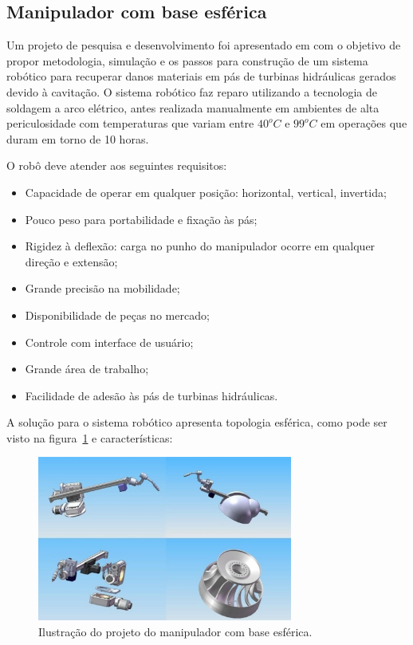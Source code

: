 \subsection{Manipulador com base esférica}
Um projeto de pesquisa e desenvolvimento foi apresentado em
\cite{motta2010prototype} com o objetivo de propor metodologia, simulação e
os passos para construção de um sistema robótico para recuperar danos materiais
em pás de turbinas hidráulicas gerados devido à cavitação. O sistema robótico faz
reparo utilizando a tecnologia de soldagem a arco elétrico, antes realizada
manualmente em ambientes de alta periculosidade com temperaturas que variam
entre $40^o C$ e $99^o C$ em operações que duram em torno de 10 horas.

O robô deve atender aos seguintes requisitos:
\begin{itemize}
  \item Capacidade de operar em qualquer posição: horizontal, vertical,
  invertida;
  \item Pouco peso para portabilidade e fixação às pás;
  \item Rigidez à deflexão: carga no punho do manipulador ocorre em qualquer
  direção e extensão;
  \item Grande precisão na mobilidade;
  \item Disponibilidade de peças no mercado;
  \item Controle com interface de usuário;
  \item Grande área de trabalho;
  \item Facilidade de adesão às pás de turbinas hidráulicas.
\end{itemize}

A solução para o sistema robótico apresenta topologia esférica, como pode ser
visto na figura~\ref{fig:esferico} e características:

\begin{figure}[ht]
\centering
\includegraphics[width=8.4cm]{figs/esferico/esferico.jpg}
\caption{Ilustração do projeto do manipulador com base esférica.}
\label{fig:esferico}
\end{figure}

